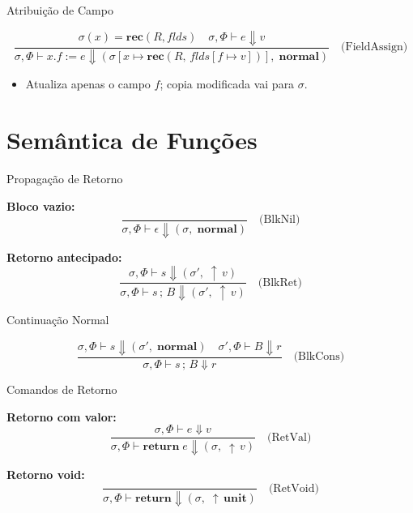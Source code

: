 \begin{frame}{Atribuição de Campo}

    \[\frac{\sigma(x) = \mathbf{rec}(R,\mathit{flds})
    \quad \sigma,\Phi \vdash e \Downarrow v}
    {\sigma,\Phi \vdash x.f \mathbin{:=} e
    \Downarrow (\sigma[x \mapsto \mathbf{rec}(R,\,\mathit{flds}[f \mapsto v])],\;
    \mathbf{normal})}
    \quad\text{(FieldAssign)}\]

    \begin{itemize}

        \item
        Atualiza apenas o campo \(f\); copia modificada vai para \(\sigma\).
    \end{itemize}
\end{frame}


\section{Semântica de Funções}\label{semuxe2ntica-de-funuxe7uxf5es}

\begin{frame}{Propagação de Retorno}

    \textbf{Bloco vazio:} \[\frac{}
    {\sigma,\Phi \vdash \epsilon \Downarrow (\sigma,\; \mathbf{normal})}
    \quad\text{(BlkNil)}\]

    \textbf{Retorno antecipado:}
    \[\frac{\sigma,\Phi \vdash s \Downarrow (\sigma',\; {\uparrow}\,v)}
    {\sigma,\Phi \vdash s\,;\,B \Downarrow (\sigma',\; {\uparrow}\,v)}
    \quad\text{(BlkRet)}\]
\end{frame}

\begin{frame}{Continuação Normal}

    \[\frac{\sigma,\Phi \vdash s \Downarrow (\sigma',\; \mathbf{normal})
    \quad \sigma',\Phi \vdash B \Downarrow r}
    {\sigma,\Phi \vdash s\,;\,B \Downarrow r}
    \quad\text{(BlkCons)}\]
\end{frame}

\begin{frame}{Comandos de Retorno}

    \textbf{Retorno com valor:} \[\frac{\sigma,\Phi \vdash e \Downarrow v}
    {\sigma,\Phi \vdash \mathbf{return}\; e \Downarrow (\sigma,\; {\uparrow}\,v)}
    \quad\text{(RetVal)}\]

    \textbf{Retorno void:} \[\frac{}
    {\sigma,\Phi \vdash \mathbf{return} \Downarrow (\sigma,\; {\uparrow}\,\mathbf{unit})}
    \quad\text{(RetVoid)}\]
\end{frame}

